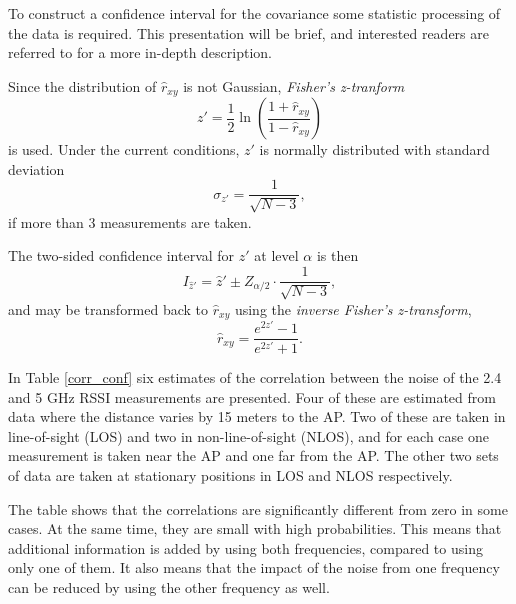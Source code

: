 \documentclass{LTHthesis}
\begin{document}
To construct a confidence interval for the covariance some statistic processing of the data is required. This presentation will be brief, and interested readers are referred to \cite{fisher15, fisher21}  for a more in-depth description. 

Since the distribution of $\hat r_{xy}$ is not Gaussian, \emph{Fisher's z-tranform}
%
\begin{equation}
z'=\frac{1}{2}\ln{\left(\frac{1+\hat r_{xy}}{1-\hat r_{xy}}\right)}
\end{equation}
%
is used. Under the current conditions, $ z'$ is normally distributed with standard deviation
%
\begin{equation}
\sigma_{z'}=\frac{1}{\sqrt{N-3}},
\end{equation} 
%
if more than 3 measurements are taken. 

The two-sided confidence interval for $z'$ at level $\alpha$ is then
%
\begin{equation}
I_{\hat z'} = \hat z' \pm Z_{\alpha/2}\cdot\frac{1}{\sqrt{N-3}}, 
\end{equation}
%
and may be transformed back to $\hat  r_{xy}$ using the \emph{inverse Fisher's z-transform},
%
\begin{equation}
\hat r_{xy}=\frac{e^{2z'}-1}{e^{2z'}+1}.
\end{equation}

In Table \ref{corr_conf} six estimates of the correlation between the noise of the 2.4 and 5 GHz RSSI measurements are presented. Four of these are estimated from data where the distance varies by 15 meters to the AP. Two of these are taken in line-of-sight (LOS) and two in non-line-of-sight (NLOS), and for each case one measurement is taken near the AP and one far from the AP. The other two sets of data are taken at stationary positions in LOS and NLOS respectively.

The table shows that the correlations are significantly different from zero in some cases. At the same time, they are small with high probabilities. This means that additional information is added by using both frequencies, compared to using only one of them. It also means that the impact of the noise from one frequency can be reduced by using the other frequency as well.
\end{document}
